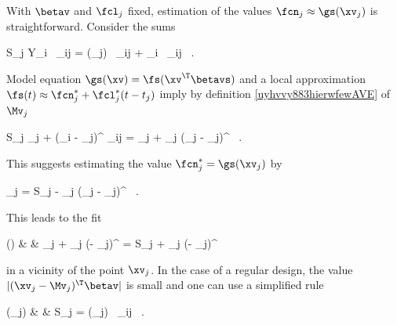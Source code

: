 With \( \betav \) and \( \fcl_{j} \) fixed, estimation of the values \( \fcn_{j} \approx \gs(\xv_{j}) \) is straightforward.
Consider the sums
\begin{EQA}[c]
	S_{j}
	\eqdef
	\sumI Y_{i} \, \weight_{ij}
	=
	\sumI \gs(\Xv_{j}) \, \weight_{ij}
	+  
	\sumI \eps_{i} \, \weight_{ij}
	\, .
\end{EQA}
Model equation \( \gs(\xv) = \fs(\xv^{\T} \betavs) \) and
a local approximation \( \fs(t) \approx \fcns_{j} + \fcls_{j} (t - t_{j}) \) imply by definition \eqref{uyhvvy883hierwfewAVE}
of \( \Xbar_{j} \)
\begin{EQA}[c]
	\E S_{j}
	\approx
	\fcn_{j} +  \sumI (\Xv_{i} - \xv_{j})^{\T} \betavs \; \weight_{ij}
	=
	\fcns_{j} + \fcls_{j} (\Xbar_{j} - \xv_{j})^{\T} \betavs 
	\, .
\end{EQA}
This suggests estimating the value \( \fcns_{j} = \gs(\xv_{j}) \) by
\begin{EQA}[c]
	\fcn_{j}
	=
	S_{j} - \fcl_{j} (\Xbar_{j} - \xv_{j})^{\T} \betav
	\, .
\end{EQA}
This leads to the fit
\begin{EQA}[rcl]
	\gs(\xv)
	& \approx &
	\fcn_{j} + \fcl_{j} (\xv - \xv_{j})^{\T} \betav
	=
	S_{j} + \fcl_{j} (\xv - \Xbar_{j})^{\T} \betav
\end{EQA}
in a vicinity of the point \( \xv_{j} \).
In the case of a regular design, the value \( |(\xv_{j} - \Xbar_{j})^{\T} \betav| \) is small and one can use 
a simplified rule
\begin{EQA}[rcl]
	\gs(\xv_{j})
	& \approx &
	S_{j}
	=
	\sumI \gs(\Xv_{j}) \, \weight_{ij}
	\, .
\label{jfuyujudeyudy7dyuew}
\end{EQA}

